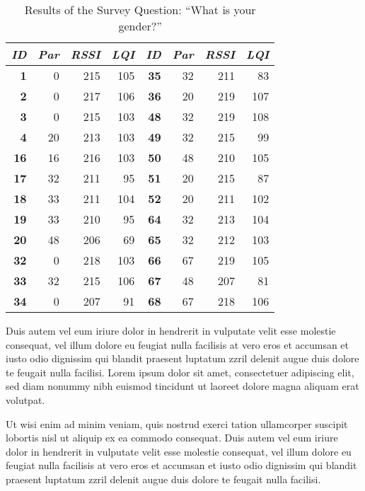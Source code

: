 \begin{table}
\begin{center}
\begin{tabular}{|r|r|r|r||r|r|r|r|}
\hline \textbf{\textit{ID}} & \textbf{\textit{Par}} & \textbf{\textit{RSSI}} &
\textbf{\textit{LQI}} &
\textbf{\textit{ID}} & \textbf{\textit{Par}} & \textbf{\textit{RSSI}} & \textbf{\textit{LQI}} \\
\hline \hline
\textbf{1}  &  0 & 215 & 105 & \textbf{35} & 32 & 211 &  83 \\
\textbf{2}  &  0 & 217 & 106 & \textbf{36} & 20 & 219 & 107 \\
\textbf{3}  &  0 & 215 & 103 & \textbf{48} & 32 & 219 & 108 \\
\textbf{4}  & 20 & 213 & 103 & \textbf{49} & 32 & 215 &  99 \\
\textbf{16} & 16 & 216 & 103 & \textbf{50} & 48 & 210 & 105 \\
\textbf{17} & 32 & 211 &  95 & \textbf{51} & 20 & 215 &  87 \\
\textbf{18} & 33 & 211 & 104 & \textbf{52} & 20 & 211 & 102 \\
\textbf{19} & 33 & 210 &  95 & \textbf{64} & 32 & 213 & 104 \\
\textbf{20} & 48 & 206 &  69 & \textbf{65} & 32 & 212 & 103 \\
\textbf{32} &  0 & 218 & 103 & \textbf{66} & 67 & 219 & 105 \\
\textbf{33} & 32 & 215 & 106 & \textbf{67} & 48 & 207 &  81 \\
\textbf{34} &  0 & 207 &  91 & \textbf{68} & 67 & 218 & 106 \\
\hline
\end{tabular}
\caption{Results of the Survey Question: ``What is your gender?''}
\end{center}
\end{table}

Duis autem vel eum iriure dolor in hendrerit in vulputate velit esse molestie
consequat, vel illum dolore eu feugiat nulla facilisis at vero eros et accumsan
et iusto odio dignissim qui blandit praesent luptatum zzril delenit augue duis
dolore te feugait nulla facilisi. Lorem ipsum dolor sit amet, consectetuer
adipiscing elit, sed diam nonummy nibh euismod tincidunt ut laoreet dolore
magna aliquam erat volutpat.

Ut wisi enim ad minim veniam, quis nostrud exerci tation ullamcorper suscipit
lobortis nisl ut aliquip ex ea commodo consequat. Duis autem vel eum iriure
dolor in hendrerit in vulputate velit esse molestie consequat, vel illum dolore
eu feugiat nulla facilisis at vero eros et accumsan et iusto odio dignissim qui
blandit praesent luptatum zzril delenit augue duis dolore te feugait nulla
facilisi.

